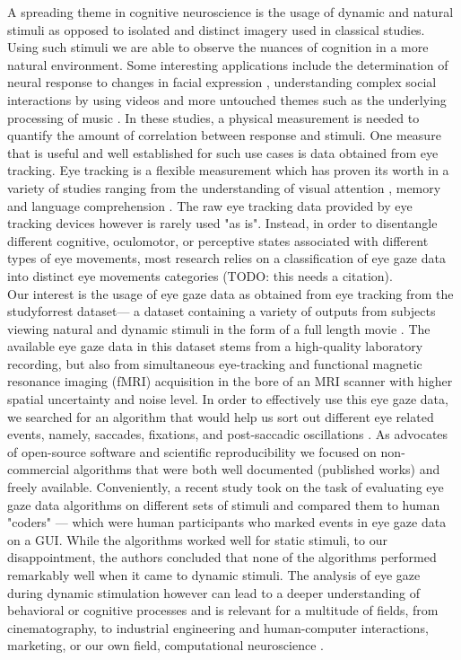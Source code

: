 A spreading theme in cognitive neuroscience is the usage of dynamic and natural stimuli as opposed to isolated and distinct imagery used in classical studies. Using such stimuli we are able to observe the nuances of cognition in a more natural environment. Some interesting applications include the determination of neural response to changes in facial expression \citep{Harris2014}, understanding complex social interactions by using videos \citep{Tikka2012} and more untouched themes such as the underlying processing of music \citep{Toiviainen2014}.  In these studies, a physical measurement is needed to quantify the amount of correlation between response and stimuli. One measure that is useful and well established for such use cases is data obtained from eye tracking. Eye tracking is a flexible measurement which has proven its worth in a variety of studies ranging from the understanding of visual attention \citep{HantaoLiu2011}, memory \citep{Hannula2010} and language comprehension \citep{Gordon2006}. The raw eye tracking data provided by eye tracking devices however is rarely used "as is". Instead, in order to disentangle different cognitive, oculomotor, or perceptive states associated with different types of eye movements, most research relies on a classification of eye gaze data into distinct eye movements categories (TODO: this needs a citation). \\
Our interest is the usage of eye gaze data as obtained from eye tracking from the studyforrest dataset--- a dataset containing a variety of outputs from subjects viewing natural and dynamic stimuli in the form of a full length movie \citep{Hanke2016}. The available eye gaze data in this dataset stems from a high-quality laboratory recording, but also from simultaneous eye-tracking and functional magnetic resonance imaging (fMRI) acquisition in the bore of an MRI scanner with higher spatial uncertainty and noise level. In order to effectively use this eye gaze data, we searched for an algorithm that would help us sort out different eye related events, namely, saccades, fixations, and post-saccadic oscillations . As advocates of open-source software and scientific reproducibility we focused on non-commercial algorithms that were both well documented (published works) and freely available. Conveniently, a recent study \citep{Andersson2017} took on the task of evaluating eye gaze data algorithms on different sets of stimuli and compared them to human "coders" --- which were human participants who marked events in eye gaze data on a GUI. While the algorithms worked well for static stimuli, to our disappointment, the authors concluded that none of the algorithms performed remarkably well when it came to dynamic stimuli. The analysis of eye gaze during dynamic stimulation however can lead to a deeper understanding of behavioral or cognitive processes and is relevant for a multitude of fields, from cinematography, to industrial engineering and human-computer interactions, marketing, or our own field, computational neuroscience \citep{Duchowski2002}. \\
